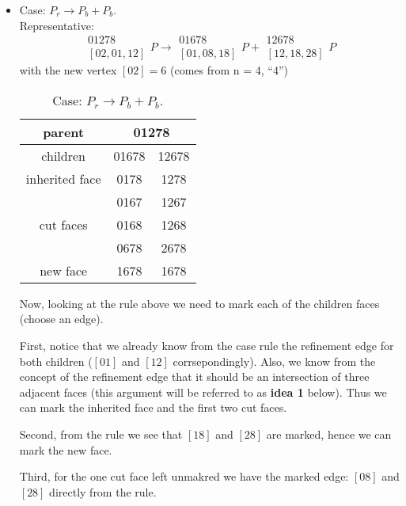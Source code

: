 \documentclass[a4paper,12pt]{amsart}
\numberwithin{equation}{section}
\begin{document}
\begin{itemize}
	\item Case: $P_r \rightarrow P_b + P_b$. \\
	Representative: 
	$$ \begin{array}{c} 01278 \\ \left[02,01,12\right] \end{array} P
	\rightarrow 
	\begin{array}{c} 01678 \\ \left[01,08,18\right] \end{array} P +
	\begin{array}{c} 12678 \\ \left[12,18,28\right] \end{array} P $$
	with the new vertex $\left[02\right] = 6$ (comes from n = 4, ``4'')
	
	\begin{table}[h!]
	\caption{Case: $P_r \rightarrow P_b + P_b$.}
	\label{tab:Case1}
	\begin{tabular}{|c|c|c|} \hline
	parent & \multicolumn{2}{|c|}{01278} \\ \hline
	children & 01678 & 12678 \\ \hline
	inherited face & 0178 & 1278 \\ \hline
	\multirow{3}{*}{cut faces} & 0167 & 1267 \\ 
	 & 0168 & 1268 \\ 
	 & 0678 & 2678 \\ \hline
	 new face & 1678 & 1678 \\ \hline
	\end{tabular}
	\end{table}
    Now, looking at the rule above we need to mark each of the children faces (choose an edge). 
    
    First, notice that we already know from the case rule the refinement edge for both children ($\left[01\right]$ and $\left[12\right]$ corrsepondingly). Also, we know from the concept of the refinement edge that it should be an intersection of three adjacent faces (this argument will be referred to as \textbf{idea 1} below). Thus we can mark the inherited face and the first two cut faces.
    
    Second, from the rule we see that $\left[18\right]$ and $\left[28\right]$ are marked, hence we can mark the new face.
    
    Third, for the one cut face left unmakred we have the marked edge: $\left[08\right]$ and $\left[28\right]$ directly from the rule.
      

\end{itemize}
\end{document}
